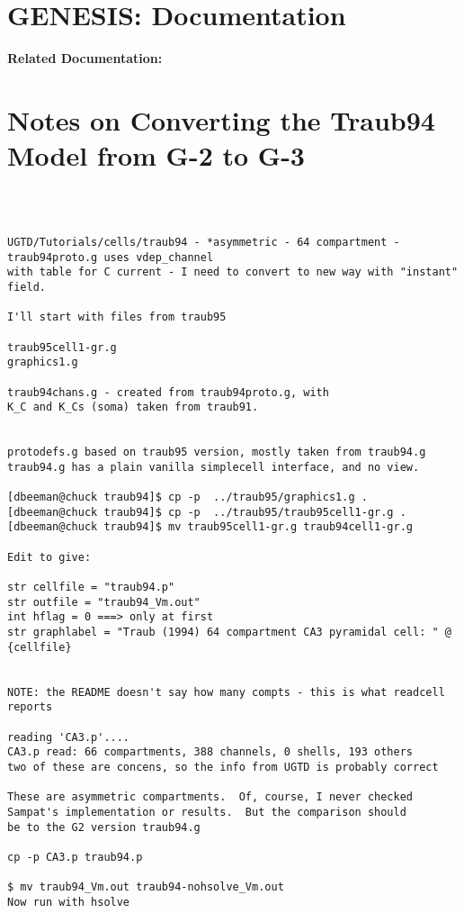 \documentclass[12pt]{article}
\begin{document}
\section*{GENESIS: Documentation}

{\bf Related Documentation:}

\section*{Notes on Converting the Traub94 Model from G-2 to G-3}

\begin{verbatim}



UGTD/Tutorials/cells/traub94 - *asymmetric - 64 compartment -
traub94proto.g uses vdep_channel
with table for C current - I need to convert to new way with "instant"
field.

I'll start with files from traub95

traub95cell1-gr.g 
graphics1.g 

traub94chans.g - created from traub94proto.g, with
K_C and K_Cs (soma) taken from traub91.


protodefs.g based on traub95 version, mostly taken from traub94.g
traub94.g has a plain vanilla simplecell interface, and no view.

[dbeeman@chuck traub94]$ cp -p  ../traub95/graphics1.g .
[dbeeman@chuck traub94]$ cp -p  ../traub95/traub95cell1-gr.g .
[dbeeman@chuck traub94]$ mv traub95cell1-gr.g traub94cell1-gr.g

Edit to give:

str cellfile = "traub94.p"
str outfile = "traub94_Vm.out"
int hflag = 0 ===> only at first
str graphlabel = "Traub (1994) 64 compartment CA3 pyramidal cell: " @ {cellfile}


NOTE: the README doesn't say how many compts - this is what readcell reports 

reading 'CA3.p'.... 
CA3.p read: 66 compartments, 388 channels, 0 shells, 193 others
two of these are concens, so the info from UGTD is probably correct

These are asymmetric compartments.  Of, course, I never checked
Sampat's implementation or results.  But the comparison should
be to the G2 version traub94.g

cp -p CA3.p traub94.p

$ mv traub94_Vm.out traub94-nohsolve_Vm.out
Now run with hsolve


\end{verbatim}
\end{document}
